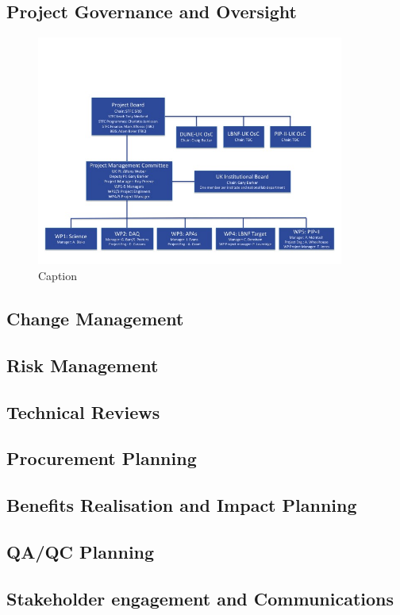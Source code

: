 \subsection{Project Governance and Oversight}
\begin{figure}[htb]
    \centering
    \includegraphics[width=0.9\textwidth]{figs/DUNE-UK-org-v6.jpg}
    \caption{Caption}
    \label{fig:organogram}
\end{figure}

\subsection{Change Management}
\subsection{Risk Management}
\subsection{Technical Reviews}
\subsection{Procurement Planning}
\subsection{Benefits Realisation and Impact Planning}
\subsection{QA/QC Planning}
\subsection{Stakeholder engagement and Communications}
